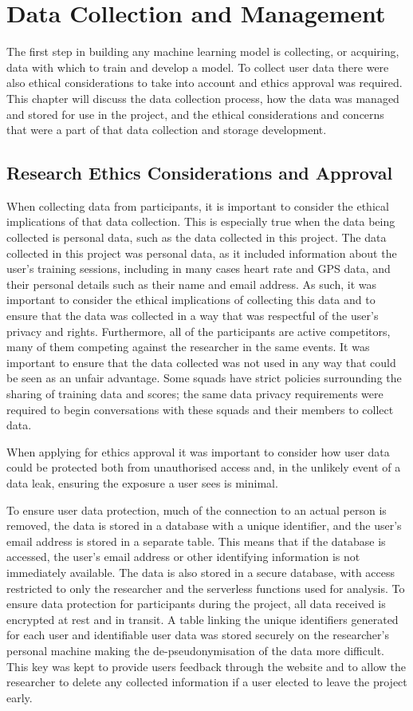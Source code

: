 \chapter{Data Collection and Management}
The first step in building any machine learning model is collecting, or acquiring, data with which to train and develop a model. To collect user data there were also ethical considerations to take into account and ethics approval was required. This chapter will discuss the data collection process, how the data was managed and stored for use in the project, and the ethical considerations and concerns that were a part of that data collection and storage development.

\section{Research Ethics Considerations and Approval}
When collecting data from participants, it is important to consider the ethical implications of that data collection. This is especially true when the data being collected is personal data, such as the data collected in this project. The data collected in this project was personal data, as it included information about the user's training sessions, including in many cases heart rate and GPS data, and their personal details such as their name and email address. As such, it was important to consider the ethical implications of collecting this data and to ensure that the data was collected in a way that was respectful of the user's privacy and rights. Furthermore, all of the participants are active competitors, many of them competing against the researcher in the same events. It was important to ensure that the data collected was not used in any way that could be seen as an unfair advantage. Some squads have strict policies surrounding the sharing of training data and scores; the same data privacy requirements were required to begin conversations with these squads and their members to collect data. 

When applying for ethics approval it was important to consider how user data could be protected both from unauthorised access and, in the unlikely event of a data leak, ensuring the exposure a user sees is minimal.

To ensure user data protection, much of the connection to an actual person is removed, the data is stored in a database with a unique identifier, and the user's email address is stored in a separate table. This means that if the database is accessed, the user's email address or other identifying information is not immediately available. The data is also stored in a secure database, with access restricted to only the researcher and the serverless functions used for analysis. To ensure data protection for participants during the project, all data received is encrypted at rest and in transit. A table linking the unique identifiers generated for each user and identifiable user data was stored securely on the researcher's personal machine making the de-pseudonymisation of the data more difficult. This key was kept to provide users feedback through the website and to allow the researcher to delete any collected information if a user elected to leave the project early.

